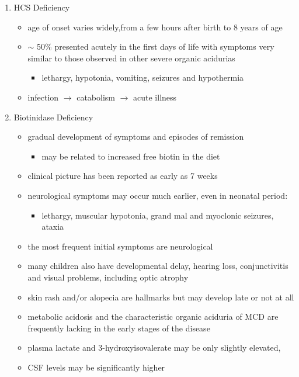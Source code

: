 \documentclass{scrartcl}
\begin{document}
\begin{enumerate}
\item HCS Deficiency
\label{sec:org10b6b6d}
\begin{itemize}
\item age of onset varies widely,from a few hours after birth to 8 years
of age
\item \(\sim\) 50\% presented acutely in the first days of life with symptoms
very similar to those observed in other severe organic acidurias
\begin{itemize}
\item lethargy, hypotonia, vomiting, seizures and hypothermia
\end{itemize}
\item infection \(\to\) catabolism \(\to\) acute illness
\end{itemize}

\item Biotinidase Deficiency
\label{sec:org3678c1f}
\begin{itemize}
\item gradual development of symptoms and episodes of remission
\begin{itemize}
\item may be related to increased free biotin in the diet
\end{itemize}
\item clinical picture has been reported as early as 7 weeks
\item neurological symptoms may occur much earlier, even in neonatal period:
\begin{itemize}
\item lethargy, muscular hypotonia, grand mal and myoclonic seizures, ataxia
\end{itemize}
\item the most frequent initial symptoms are neurological
\item many children also have developmental delay, hearing loss,
conjunctivitis and visual problems, including optic atrophy
\item skin rash and/or alopecia are hallmarks but may develop late or not
at all
\item metabolic acidosis and the characteristic organic aciduria of MCD
are frequently lacking in the early stages of the disease
\item plasma lactate and 3-hydroxyisovalerate may be only slightly
elevated,
\item CSF levels may be significantly higher
\end{itemize}
\end{enumerate}
\end{document}
